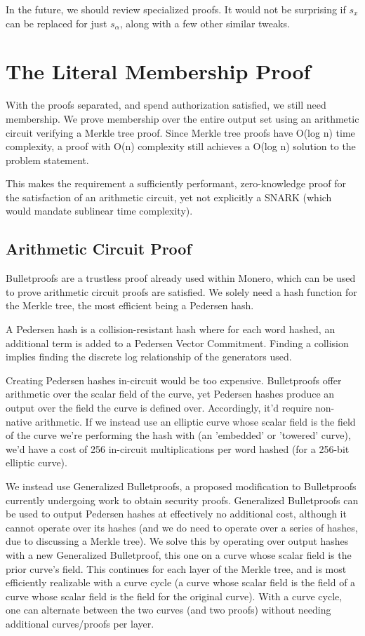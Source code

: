 \documentclass[]{article}
\begin{document}
In the future, we should review specialized proofs. It would not be surprising if $s_x$ can be replaced for just $s_\alpha$, along with a few other similar tweaks.

\newpage

\section{The Literal Membership Proof}

With the proofs separated, and spend authorization satisfied, we still need membership. We prove membership over the entire output set using an arithmetic circuit verifying a Merkle tree proof. Since Merkle tree proofs have O(log n) time complexity, a proof with O(n) complexity still achieves a O(log n) solution to the problem statement.

This makes the requirement a sufficiently performant, zero-knowledge proof for the satisfaction of an arithmetic circuit, yet not explicitly a SNARK (which would mandate sublinear time complexity).

\subsection{Arithmetic Circuit Proof}

Bulletproofs are a trustless proof already used within Monero, which can be used to prove arithmetic circuit proofs are satisfied. We solely need a hash function for the Merkle tree, the most efficient being a Pedersen hash.

A Pedersen hash is a collision-resistant hash where for each word hashed, an additional term is added to a Pedersen Vector Commitment. Finding a collision implies finding the discrete log relationship of the generators used.

Creating Pedersen hashes in-circuit would be too expensive. Bulletproofs offer arithmetic over the scalar field of the curve, yet Pedersen hashes produce an output over the field the curve is defined over. Accordingly, it'd require non-native arithmetic. If we instead use an elliptic curve whose scalar field is the field of the curve we're performing the hash with (an 'embedded' or 'towered' curve), we'd have a cost of 256 in-circuit multiplications per word hashed (for a 256-bit elliptic curve).

We instead use Generalized Bulletproofs, a proposed modification to Bulletproofs currently undergoing work to obtain security proofs. Generalized Bulletproofs can be used to output Pedersen hashes at effectively no additional cost, although it cannot operate over its hashes (and we do need to operate over a series of hashes, due to discussing a Merkle tree). We solve this by operating over output hashes with a new Generalized Bulletproof, this one on a curve whose scalar field is the prior curve's field. This continues for each layer of the Merkle tree, and is most efficiently realizable with a curve cycle (a curve whose scalar field is the field of a curve whose scalar field is the field for the original curve). With a curve cycle, one can alternate between the two curves (and two proofs) without needing additional curves/proofs per layer.
\end{document}
